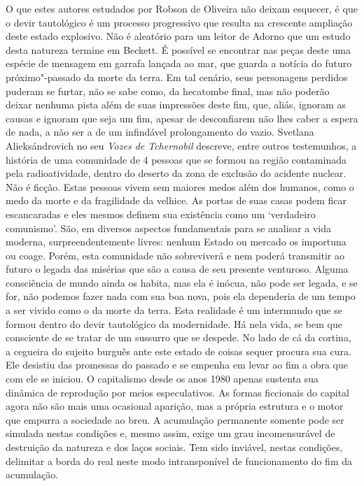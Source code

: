 {O que estes autores estudados por Robson de Oliveira não deixam
esquecer, é que o devir tautológico é um processo progressivo que
resulta na crescente ampliação deste estado explosivo. Não é aleatório
para um leitor de Adorno que um estudo desta natureza termine em
Beckett. É possível se encontrar nas peças deste uma espécie de mensagem
em garrafa lançada ao mar, que guarda a notícia do futuro
próximo"-passado da morte da terra. Em tal cenário, seus personagens
perdidos puderam se furtar, não se sabe como, da hecatombe final, mas
não poderão deixar nenhuma pista além de suas impressões deste fim, que,
aliás, ignoram as causas e ignoram que seja um fim, apesar de
desconfiarem não lhes caber a espera de nada, a não ser a de um
infindável prolongamento do vazio. Svetlana Alieksándrovich no seu
\emph{Vozes de Tchernobil} descreve, entre outros testemunhos, a
história de uma comunidade de 4 pessoas que se formou na região
contaminada pela radioatividade, dentro do deserto da zona de exclusão
do acidente nuclear. Não é ficção. Estas pessoas vivem sem maiores medos
além dos humanos, como o medo da morte e da fragilidade da velhice. As
portas de suas casas podem ficar escancaradas e eles mesmos definem sua
existência como um `verdadeiro comunismo'. São, em diversos aspectos
fundamentais para se analisar a vida moderna, surpreendentemente livres:
nenhum Estado ou mercado os importuna ou coage. Porém, esta comunidade
não sobreviverá e nem poderá transmitir ao futuro o legada das misérias
que são a causa de seu presente venturoso. Alguma consciência de mundo
ainda os habita, mas ela é inócua, não pode ser legada, e se for, não
podemos fazer nada com sua boa nova, pois ela dependeria de um tempo a
ser vivido como o da morte da terra. Esta realidade é um intermundo que
se formou dentro do devir tautológico da modernidade. Há nela vida, se
bem que consciente de se tratar de um sussurro que se despede. No lado
de cá da cortina, a cegueira do sujeito burguês ante este estado de
coisas sequer procura sua cura. Ele desistiu das promessas do passado e
se empenha em levar ao fim a obra que com ele se iniciou. O capitalismo
desde os anos 1980 apenas sustenta sua dinâmica de reprodução por meios
especulativos. As formas ficcionais do capital agora não são mais uma
ocasional aparição, mas a própria estrutura e o motor que empurra a
sociedade ao breu. A acumulação permanente somente pode ser simulada
nestas condições e, mesmo assim, exige um grau incomensurável de
destruição da natureza e dos laços sociais. Tem sido inviável, nestas
condições, delimitar a borda do real neste modo intransponível de
funcionamento do fim da acumulação.

}
